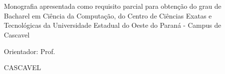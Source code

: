 
\fontsize{12}{12}
\begin{center}
\textbf{\autor}\\
\vspace{8cm}
\fontsize{14}{14}
\textbf{\titulo}\\
\vspace{2cm}
\end{center}
\fontsize{12}{12}

\begin{flushright}
\begin{minipage}[10cm] {8.5cm}
Monografia apresentada como requisito parcial para obten\c{c}\~{a}o do grau de Bacharel em Ci\^{e}ncia da Computa\c{c}\~{a}o, do Centro de Ci\^{e}ncias Exatas e Tecnol\'{o}gicas da Universidade Estadual do Oeste do Paran\'{a} - Campus de Cascavel

\vspace{1.5cm}
\noindent
\end{minipage}
\begin{sloppypar}Orientador: Prof. \orientador\end{sloppypar}
\end{flushright}

\vspace{5.5cm}
\begin{center}
CASCAVEL\\
\ano
\end{center}
